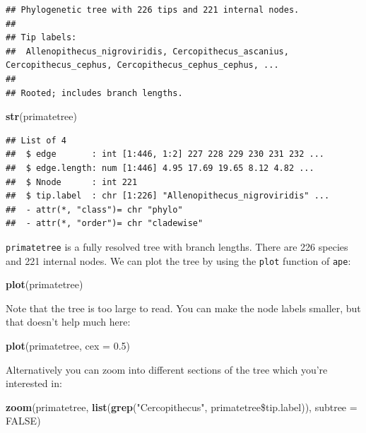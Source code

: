 \documentclass[12pt]{article}
\newcommand{\KeywordTok}[1]{\textcolor[rgb]{0.13,0.29,0.53}{\textbf{{#1}}}}
\newcommand{\DataTypeTok}[1]{\textcolor[rgb]{0.13,0.29,0.53}{{#1}}}
\newcommand{\FloatTok}[1]{\textcolor[rgb]{0.00,0.00,0.81}{{#1}}}
\newcommand{\StringTok}[1]{\textcolor[rgb]{0.31,0.60,0.02}{{#1}}}
\newcommand{\OtherTok}[1]{\textcolor[rgb]{0.56,0.35,0.01}{{#1}}}
\newcommand{\NormalTok}[1]{{#1}}
\begin{document}
\begin{verbatim}
## Phylogenetic tree with 226 tips and 221 internal nodes.
## 
## Tip labels:
##  Allenopithecus_nigroviridis, Cercopithecus_ascanius, 
Cercopithecus_cephus, Cercopithecus_cephus_cephus, ...
## 
## Rooted; includes branch lengths.
\end{verbatim}

\begin{snugshade}
\begin{Highlighting}[]
\KeywordTok{str}\NormalTok{(primatetree)}
\end{Highlighting}
\end{snugshade}

\begin{verbatim}
## List of 4
##  $ edge       : int [1:446, 1:2] 227 228 229 230 231 232 ...
##  $ edge.length: num [1:446] 4.95 17.69 19.65 8.12 4.82 ...
##  $ Nnode      : int 221
##  $ tip.label  : chr [1:226] "Allenopithecus_nigroviridis" ...
##  - attr(*, "class")= chr "phylo"
##  - attr(*, "order")= chr "cladewise"
\end{verbatim}

\texttt{primatetree} is a fully resolved tree with branch lengths. There are 226
species and 221 internal nodes. We can plot the tree by using the \texttt{plot}
function of \texttt{ape}:

\begin{snugshade}
\begin{Highlighting}[]
\KeywordTok{plot}\NormalTok{(primatetree}\NormalTok{)}
\end{Highlighting}
\end{snugshade}

Note that the tree is too large to read. You can make the node labels smaller, but that doesn’t help much here:

\begin{snugshade}
\begin{Highlighting}[]
\KeywordTok{plot}\NormalTok{(primatetree, }\DataTypeTok{cex =} \FloatTok{0.5}\NormalTok{)}
\end{Highlighting}
\end{snugshade}

Alternatively you can zoom into different sections of the tree which you’re interested in:

\begin{snugshade}
\begin{Highlighting}[]
\KeywordTok{zoom}\NormalTok{(primatetree, }\KeywordTok{list}\NormalTok{(}\KeywordTok{grep}\NormalTok{(}\StringTok{"Cercopithecus"}\NormalTok{, primatetree\$tip.label)), }
      \DataTypeTok{subtree =} \OtherTok{FALSE}\NormalTok{)}
\end{Highlighting}
\end{snugshade}
\end{document}
